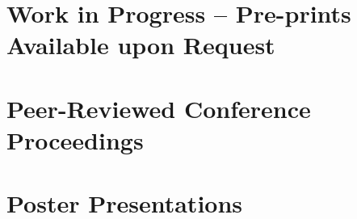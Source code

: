 \documentclass[10pt,colorlinks=true,urlcolor=teal]{moderncv}
\begin{document}
\section{Work in Progress -- Pre-prints Available upon Request}
\vspace{-15pt}

\section{Peer-Reviewed Conference Proceedings}
\vspace{-15pt}

\begin{comment}
\section{Other Publications}
\vspace{-15pt}
\nociteother{}
\bibliographystyleother{unsrtinit}
\bibliographyother{gkiar}
\end{comment}

\begin{comment}
\section{Unpublished Work}
\vspace{-15pt}
\nociteunp{}
\bibliographystyleunp{unsrtinit}
\bibliographyunp{gkiar}
\end{comment}

\begin{comment}
\section{Invited Talks}
\vspace{-15pt}
\nocitetalks{}
\bibliographystyletalks{unsrtinit}
\bibliographytalks{gkiar}
\end{comment}

\section{Poster Presentations}
\vspace{-15pt}
\end{document}
